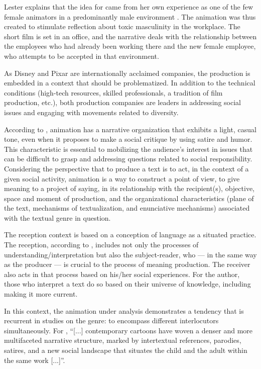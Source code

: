\documentclass[english]{textolivre}
\begin{document}
Lester explains that the idea for \textcite{purl} came from her own experience as one of the few female animators in a predominantly male environment \cite{meet2019}. The animation was thus created to stimulate reflection about toxic masculinity in the workplace. The short film is set in an office, and the narrative deals with the relationship between the employees who had already been working there and the new female employee, who attempts to be accepted in that environment. 

As Disney and Pixar are internationally acclaimed companies, the production is embedded in a context that should be problematized. In addition to the technical conditions (high-tech resources, skilled professionals, a tradition of film production, etc.), both production companies are leaders in addressing social issues and engaging with movements related to diversity. 

According to \textcite{wells1998}, animation has a narrative organization that exhibits a light, casual tone, even when it proposes to make a social critique by using satire and humor. This characteristic is essential to mobilizing the audience’s interest in issues that can be difficult to grasp and addressing questions related to social responsibility. Considering the perspective that to produce a text is to act, in the context of a given social activity, animation is a way to construct a point of view, to give meaning to a project of saying, in its relationship with the recipient(s), objective, space and moment of production, and the organizational characteristics (plane of the text, mechanisms of textualization, and enunciative mechanisms) associated with the textual genre in question. 

The reception context is based on a conception of language as a situated practice. The reception, according to \textcite{leal2011organizaccao}, includes not only the processes of understanding/interpretation but also the subject-reader, who — in the same way as the producer — is crucial to the process of meaning production. The receiver also acts in that process based on his/her social experiences. For the author, those who interpret a text do so based on their universe of knowledge, including making it more current. 

In this context, the animation under analysis demonstrates a tendency that is recurrent in studies on the genre: to encompass different interlocutors simultaneously. For \textcite[p.~75]{gomes2007double}, “[...] contemporary cartoons have woven a denser and more multifaceted narrative structure, marked by intertextual references, parodies, satires, and a new social landscape that situates the child and the adult within the same work [...]”. 
\end{document}
